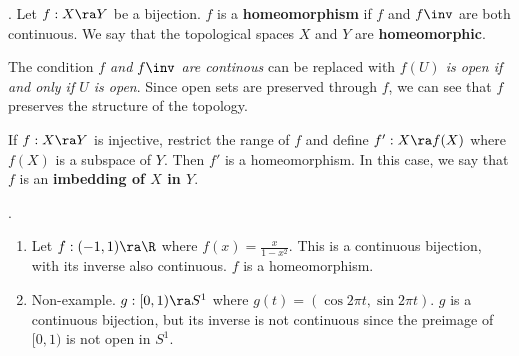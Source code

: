 .  Let \(f: X \ra Y\) be a bijection. \(f\) is a \textbf{homeomorphism} if \(f\) and \(f\inv\) are both continuous. We say that the topological spaces \(X\) and \(Y\) are \textbf{homeomorphic}.

\rmk The condition \textit{\(f\) and \(f\inv\) are continous} can be replaced with \textit{\(f(U)\) is open if and only if \(U\) is open}. Since open sets are preserved through \(f\), we can see that \(f\) preserves the structure of the topology.

\rmk If \(f : X \ra Y\) is injective, restrict the range of \(f\) and define \(f': X \ra f(X)\) where \(f(X)\) is a subspace of \(Y\). Then \(f'\) is a homeomorphism. In this case, we say that \(f\) is an \textbf{imbedding of \(X\) in \(Y\)}.

\ex.
\begin{enumerate}
    \item Let \(f: (-1, 1) \ra \R\) where \(f(x) = \frac{x}{1-x^2}\). This is a continuous bijection, with its inverse also continuous. \(f\) is a homeomorphism.
    \item Non-example. \(g : [0, 1) \ra S^1\) where \(g(t) = (\cos 2\pi t, \sin 2\pi t)\). \(g\) is a continuous bijection, but its inverse is not continuous since the preimage of \([0, 1)\) is not open in \(S^1\).
\end{enumerate}


\pagebreak
